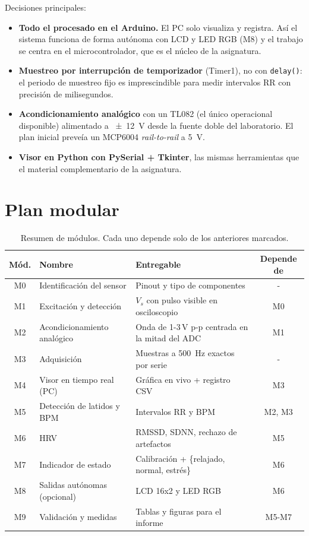 \documentclass[11pt,a4paper]{article}
\begin{document}
Decisiones principales:
\begin{itemize}[leftmargin=1.2em,itemsep=2pt,topsep=2pt]
  \item \textbf{Todo el procesado en el Arduino.} El PC solo visualiza y registra. Así el
        sistema funciona de forma autónoma con LCD y LED RGB (M8) y el trabajo se centra en el
        microcontrolador, que es el núcleo de la asignatura.
  \item \textbf{Muestreo por interrupción de temporizador} (Timer1), no con
        \texttt{delay()}: el periodo de muestreo fijo es imprescindible para medir intervalos
        RR con precisión de milisegundos.
  \item \textbf{Acondicionamiento analógico} con un TL082 (el único operacional disponible)
        alimentado a \qty{\pm 12}{V} desde la fuente doble del laboratorio. El plan inicial
        preveía un MCP6004 \emph{rail-to-rail} a \qty{5}{V}.
  \item \textbf{Visor en Python con PySerial + Tkinter}, las mismas herramientas que el
        material complementario de la asignatura.
\end{itemize}

\section{Plan modular}

\begin{table}[H]
\centering\small
\caption{Resumen de módulos. Cada uno depende solo de los anteriores marcados.}
\label{tab:modulos}
\begin{tabularx}{\textwidth}{clXc}
\toprule
Mód. & Nombre & Entregable & Depende de \\
\midrule
M0 & Identificación del sensor   & Pinout y tipo de componentes                    & - \\
M1 & Excitación y detección      & $V_s$ con pulso visible en osciloscopio         & M0 \\
M2 & Acondicionamiento analógico & Onda de 1-3\,V p-p centrada en la mitad del ADC & M1 \\
M3 & Adquisición                 & Muestras a \qty{500}{Hz} exactos por serie      & - \\
M4 & Visor en tiempo real (PC)   & Gráfica en vivo + registro CSV                  & M3 \\
M5 & Detección de latidos y BPM  & Intervalos RR y BPM                             & M2, M3 \\
M6 & HRV                         & RMSSD, SDNN, rechazo de artefactos              & M5 \\
M7 & Indicador de estado         & Calibración + \{relajado, normal, estrés\}      & M6 \\
M8 & Salidas autónomas (opcional)& LCD 16x2 y LED RGB                              & M6 \\
M9 & Validación y medidas        & Tablas y figuras para el informe                & M5-M7 \\
\bottomrule
\end{tabularx}
\end{table}
\end{document}
